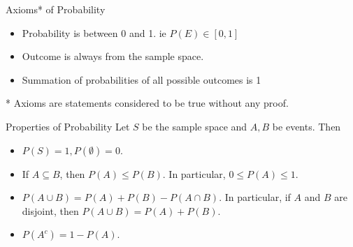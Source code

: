 %

\begin{frame}{Axioms* of Probability}
\begin{itemize}
\item Probability is between 0 and 1. ie $P(E) \in [0,1]$
\item Outcome is always from the sample space.
\item Summation of probabilities of all possible outcomes is 1
\end{itemize}

* Axioms are statements considered to be true without any proof.
\end{frame}



\begin{frame}{Properties of Probability}
Let $S$ be the sample space and $A,B$ be events.  Then
\begin{itemize}
\item $P(S)=1, P(\emptyset)=0$. 
\item If $A\subseteq B$, then $P(A)\leq P(B)$.  In particular, $0\leq P(A)\leq 1$. 
\item $P(A\cup B)=P(A)+P(B)-P(A\cap B)$.  In particular, if $A$ and $B$ are disjoint, then $P(A
\cup B)=P(A)+P(B)$. 
\item $P(A^c)=1-P(A)$.
\end{itemize}
\end{frame}


